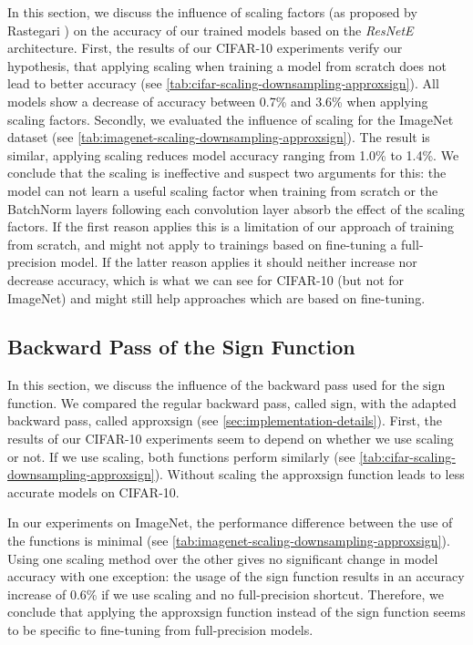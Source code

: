 \documentclass[10pt,twocolumn,letterpaper]{article}
\newcommand{\architecture}[1]{\emph{#1}}
\begin{document}
In this section, we discuss the influence of scaling factors (as proposed by Rastegari \etal\cite{Rastegari2016}) on the accuracy of our trained models based on the \architecture{ResNetE} architecture.
First, the results of our CIFAR-10 experiments verify our hypothesis, that applying scaling when training a model from scratch does not lead to better accuracy (see \autoref{tab:cifar-scaling-downsampling-approxsign}).
All models show a decrease of accuracy between 0.7\% and 3.6\% when applying scaling factors.
Secondly, we evaluated the influence of scaling for the ImageNet dataset (see \autoref{tab:imagenet-scaling-downsampling-approxsign}).
The result is similar, applying scaling reduces model accuracy ranging from 1.0\% to 1.4\%.
We conclude that the scaling is ineffective and suspect two arguments for this:
the model can not learn a useful scaling factor when training from scratch or the BatchNorm layers following each convolution layer absorb the effect of the scaling factors.
If the first reason applies this is a limitation of our approach of training from scratch, and might not apply to trainings based on fine-tuning a full-precision model.
If the latter reason applies it should neither increase nor decrease accuracy, which is what we can see for CIFAR-10 (but not for ImageNet) and might still help approaches which are based on fine-tuning.

\subsection{Backward Pass of the Sign Function}\label{sec:results-approx}

In this section, we discuss the influence of the backward pass used for the $\mathrm{sign}$ function.
We compared the regular backward pass, called $\mathrm{sign}$, with the adapted backward pass, called $\mathrm{approxsign}$ (see \autoref{sec:implementation-details}).
First, the results of our CIFAR-10 experiments seem to depend on whether we use scaling or not.
If we use scaling, both functions perform similarly (see \autoref{tab:cifar-scaling-downsampling-approxsign}).
Without scaling the $\mathrm{approxsign}$ function leads to less accurate models on CIFAR-10.

In our experiments on ImageNet, the performance difference between the use of the functions is minimal (see \autoref{tab:imagenet-scaling-downsampling-approxsign}).
Using one scaling method over the other gives no significant change in model accuracy with one exception: the usage of the sign function results in an accuracy increase of 0.6\% if we use scaling and no full-precision shortcut.
Therefore, we conclude that applying the $\mathrm{approxsign}$ function instead of the $\mathrm{sign}$ function seems to be specific to fine-tuning from full-precision models.
\end{document}
